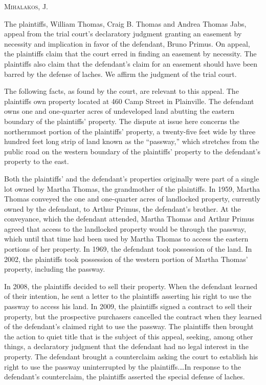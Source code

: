 

\opinion \textsc{Mihalakos}, J.

The plaintiffs, William Thomas, Craig B. Thomas and Andrea Thomas Jabs, appeal
from the trial court's declaratory judgment granting an easement by necessity
and implication in favor of the defendant, Bruno Primus. On appeal, the
plaintiffs claim that the court erred in finding an easement by
necessity. The plaintiffs
also claim that the defendant's claim for an easement should have been barred by
the defense of laches. We affirm the judgment of the trial court.

The following facts, as found by the court, are relevant to this appeal. The
plaintiffs own property located at 460 Camp Street in Plainville. The defendant
owns one and one-quarter acres of undeveloped land abutting the eastern boundary
of the plaintiffs' property. The dispute at issue here concerns the northernmost
portion of the plaintiffs' property, a twenty-five feet wide by three hundred
feet long strip of land known as the ``passway,'' which stretches from the
public road on the western boundary of the plaintiffs' property to the
defendant's property to the east.

Both the plaintiffs' and the defendant's properties originally were part of a
single lot owned by Martha Thomas, the grandmother of the plaintiffs. In 1959,
Martha Thomas conveyed the one and one-quarter acres of landlocked property,
currently owned by the defendant, to Arthur Primus, the defendant's brother. At
the conveyance, which the defendant attended, Martha Thomas and Arthur Primus
agreed that access to the landlocked property would be through the passway,
which until that time had been used by Martha Thomas to access the eastern
portions of her property. In 1969, the defendant took possession of the land. In
2002, the plaintiffs took possession of the western portion of Martha Thomas'
property, including the passway.

In 2008, the plaintiffs decided to sell their property. When the defendant
learned of their intention, he sent a letter to the plaintiffs asserting his
right to use the passway to access his land. In 2009, the plaintiffs signed a
contract to sell their property, but the prospective purchasers cancelled the
contract when they learned of the defendant's claimed right to use the passway.
The plaintiffs then brought the action to quiet title that is the subject of
this appeal, seeking, among other things, a declaratory judgment that the
defendant had no legal interest in the property. The defendant brought a
counterclaim asking the court to establish his right to use the passway
uninterrupted by the plaintiffs.\ldots In response to the defendant's
counterclaim, the plaintiffs asserted the special defense of laches.

